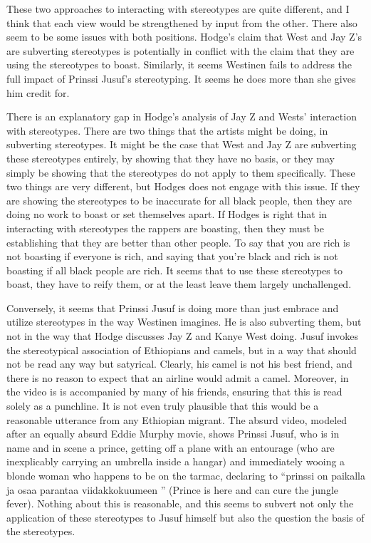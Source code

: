\documentclass[man,12pt,natbib]{apa6}
\begin{document}
These two approaches to interacting with stereotypes are quite different, and I
think that each view would be strengthened by input from the other.  There also
seem to be some issues with both positions. Hodge's claim that West and Jay Z's
are subverting stereotypes is potentially in conflict with the claim that they
are using the stereotypes to boast.  Similarly, it seems Westinen fails to
address the full impact of Prinssi Jusuf's stereotyping.  It seems he does more
than she gives him credit for. 

There is an explanatory gap in Hodge's analysis of Jay Z and Wests' interaction
with stereotypes.  There are two things that the artists might be doing, in
subverting stereotypes.  It might be the case that West and Jay Z are
subverting these stereotypes entirely, by showing that they have no basis, or
they may simply be showing that the stereotypes do not apply to them
specifically.  These two things are very different, but Hodges does not engage
with this issue.  If they are showing the stereotypes to be inaccurate for all
black people, then they are doing no work to boast or set themselves apart.  If
Hodges is right that in interacting with stereotypes the rappers are boasting,
then they must be establishing that they are better than other people.  To say
that you are rich is not boasting if everyone is rich, and saying that you're
black and rich is not boasting if all black people are rich.  It seems that to
use these stereotypes to boast, they have to reify them, or at the least leave
them largely unchallenged. 

Conversely, it seems that Prinssi Jusuf is doing more than just embrace and
utilize stereotypes in the way Westinen imagines.  He is also subverting them,
but not in the way that Hodge discusses Jay Z and Kanye West doing.  Jusuf
invokes the stereotypical association of Ethiopians and camels, but in a way
that should not be read any way but satyrical.  Clearly, his camel is not his
best friend, and there is no reason to expect that an airline would admit a
camel.  Moreover, in the video is is accompanied by many of his friends,
ensuring that this is read solely as a punchline.  It is not even truly
plausible that this would be a reasonable utterance from any Ethiopian migrant.
The absurd video, modeled after an equally absurd Eddie Murphy movie, shows
Prinssi Jusuf, who is in name and in scene a prince, getting off a plane with
an entourage (who are inexplicably carrying an umbrella inside a hangar) and
immediately wooing a blonde woman who happens to be on the tarmac, declaring to
``prinssi on paikalla ja osaa parantaa viidakkokuumeen '' (Prince is here and
can cure the jungle fever).  Nothing about this is reasonable, and this seems
to subvert not only the application of these stereotypes to Jusuf himself but
also the question the basis of the stereotypes. 
\end{document}
